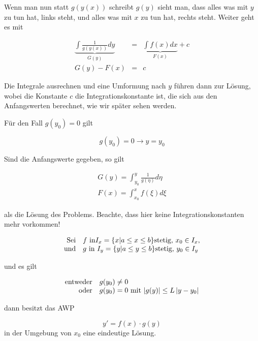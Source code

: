 \documentclass[10pt,a4paper]{article}
\begin{document}
Wenn man nun statt $g(y(x))$ schreibt $g(y)$ sieht man, dass alles was mit $y$ zu tun hat, links steht, und alles was mit $x$ zu tun hat, rechts steht. Weiter geht es mit 

\begin{eqnarray*}
\underbrace{\int \frac{1}{g(y(x))} dy}_{G(y)} &=& \underbrace{\int f(x)dx}_{F(x)} + c \\
G(y)-F(x) &=& c
\end{eqnarray*}

Die Integrale ausrechnen und eine Umformung nach $y$ führen dann zur Lösung, wobei die Konstante $c$ die Integrationskonstante ist, die sich aus den Anfangswerten berechnet, wie wir später sehen werden.

Für den Fall $g(y_0)=0$ gilt

\begin{equation}
g(y_0)=0 \rightarrow y = y_0
\end{equation}

Sind die Anfangswerte gegeben, so gilt 

\begin{eqnarray*}
G(y)=\int_{y_0}^{y} \frac{1}{g(\eta)} d\eta \\
F(x)=\int_{x_0}^{x}f(\xi) d\xi
\end{eqnarray*}


als die Lösung des Problems. Beachte, dass hier keine Integrationskonstanten mehr vorkommen!



\begin{satz}

\begin{equation*}
\begin{array}{rl} 
$Sei$ & f ~ $in$ I_x = \{x|a \leq x \leq b\} $stetig, $ x_0 \in I_x$,$ \\
$und$ & g~$in $I_y =  \{y|a \leq y \leq b\} $stetig, $ y_0 \in I_y 
\end{array}
\end{equation*}

und es gilt

\begin{equation*}
\begin{array}{rl} 
$entweder$ & g(y_0) \not= 0 \\
$oder$ & g(y_0)=0$ mit $\left| g(y) \right| \leq L\left| y-y_0\right|
\end{array}
\end{equation*}

dann besitzt das AWP 

\begin{equation*}
y'=f(x) \cdot g(y)
\end{equation*} in der Umgebung von $x_0$ eine eindeutige Lösung.
\end{satz}
\end{document}
